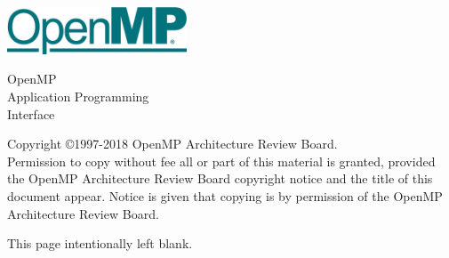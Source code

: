 
  \begin{titlepage}
    \begin{flushleft}
     \hspace{-6em} \includegraphics[width=0.4\textwidth]{openmp-logo.png}
    \end{flushleft}

    \begin{adjustwidth}{-0.75in}{0in}
    \begin{center}
      \Huge
      \textsf{OpenMP\\Application Programming\\Interface}

      \vspace{0.5in}\textsf{    }\vspace{-0.7in}
      \normalsize

      \vspace{1.0in}

      \textbf{\ompversion{}}
    \end{center}
    \end{adjustwidth}

    \vspace{3.0in}

\begin{adjustwidth}{0pt}{1em}\setlength{\parskip}{0.25\baselineskip}%
Copyright \copyright 1997-2018 OpenMP Architecture Review Board.\\
Permission to copy without fee all or part of this material is granted,
provided the OpenMP Architecture Review Board copyright notice and
the title of this document appear. Notice is given that copying is by
permission of the OpenMP Architecture Review Board.\end{adjustwidth}

  \end{titlepage}


\clearpage
\thispagestyle{empty}
\phantom{a}
This page intentionally left blank.



\vfill

